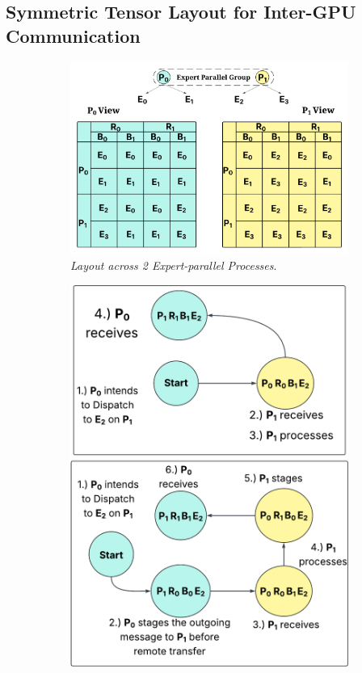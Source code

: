 \subsection{Symmetric Tensor Layout for Inter-GPU Communication}\label{subsec:symmetric-tensor-layout}
\begin{figure}[!ht]
    \centering
    \begin{subfigure}{0.55\textwidth}
        \centering
        \includegraphics[width=\linewidth, keepaspectratio]{figures/mem_layout}
        \caption{\emph{Layout across 2 Expert-parallel Processes}.}
        \label{fig:mem_layout}
    \end{subfigure}
    \begin{subfigure}{0.325\textwidth}
        \centering
        \includegraphics[width=\linewidth, keepaspectratio]{figures/sm_big}

\end{subfigure}
\end{figure}

